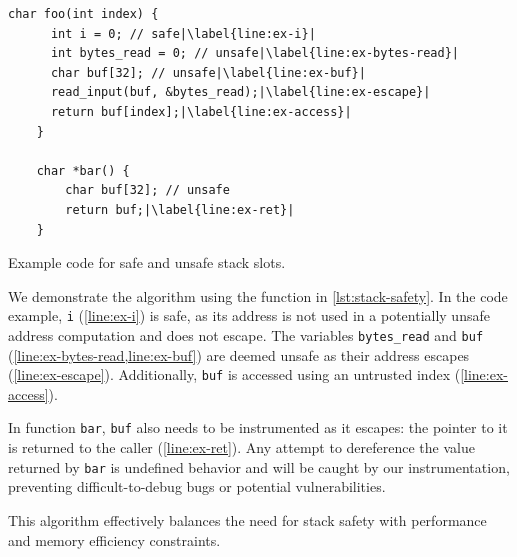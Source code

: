 \begin{lstfloat}
    \begin{lstlisting}[frame=h,style=customc,
        label={lst:stack-safety-inner},escapechar=|]
    char foo(int index) {
      int i = 0; // safe|\label{line:ex-i}|
      int bytes_read = 0; // unsafe|\label{line:ex-bytes-read}|
      char buf[32]; // unsafe|\label{line:ex-buf}|
      read_input(buf, &bytes_read);|\label{line:ex-escape}|
      return buf[index];|\label{line:ex-access}|
    }

    char *bar() {
        char buf[32]; // unsafe
        return buf;|\label{line:ex-ret}|
    }
    \end{lstlisting}
    \caption{Example code for safe and unsafe stack slots.}
    \label{lst:stack-safety}
\end{lstfloat}

We demonstrate the algorithm using the function in \cref{lst:stack-safety}.
In the code example, \texttt{i} (\cref{line:ex-i}) is safe, as its address is not used in a potentially unsafe address computation and does not escape.
The variables \texttt{bytes\_read} and \texttt{buf} (\cref{line:ex-bytes-read,line:ex-buf}) are deemed unsafe as their address escapes (\cref{line:ex-escape}).
Additionally, \texttt{buf} is accessed using an untrusted index (\cref{line:ex-access}).

\noindent
In function \texttt{bar}, \texttt{buf} also needs to be instrumented as it escapes: the pointer to it is returned to the caller (\cref{line:ex-ret}).
Any attempt to dereference the value returned by \texttt{bar} is undefined behavior and will be caught by our instrumentation, preventing difficult-to-debug bugs or potential vulnerabilities.

\noindent
This algorithm effectively balances the need for stack safety with performance and memory efficiency constraints.
